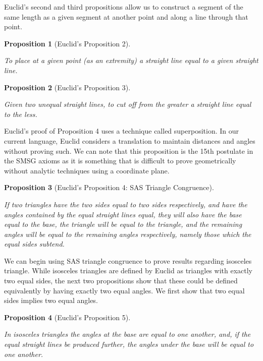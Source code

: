 \documentclass[
]{book}
\newtheorem{proposition}{Proposition}[chapter]
\theoremstyle{definition}
\theoremstyle{definition}
\theoremstyle{definition}
\theoremstyle{definition}
\theoremstyle{remark}
\begin{document}
Euclid's second and third propositions allow us to construct a segment of the same length as a given segment at another point and along a line through that point.

\begin{proposition}[Euclid's Proposition 2]
\protect\hypertarget{prp:prop2}{}\label{prp:prop2}

To place at a given point (as an extremity) a straight line equal to a given straight line.

\end{proposition}

\begin{proposition}[Euclid's Proposition 3]
\protect\hypertarget{prp:prop3}{}\label{prp:prop3}

Given two unequal straight lines, to cut off from the greater a straight line equal to the less.

\end{proposition}

Euclid's proof of Proposition 4 uses a technique called superposition. In our current language, Euclid considers a translation to maintain distances and angles without proving such. We can note that this proposition is the 15th postulate in the SMSG axioms as it is something that is difficult to prove geometrically without analytic techniques using a coordinate plane.

\begin{proposition}[Euclid's Proposition 4: SAS Triangle Congruence]
\protect\hypertarget{prp:prop4}{}\label{prp:prop4}

If two triangles have the two sides equal to two sides respectively, and have the angles contained by the equal straight lines equal, they will also have the base equal to the base, the triangle will be equal to the triangle, and the remaining angles will be equal to the remaining angles respectively, namely those which the equal sides subtend.

\end{proposition}

We can begin using SAS triangle congruence to prove results regarding isosceles triangle. While isosceles triangles are defined by Euclid as triangles with exactly two equal sides, the next two propositions show that these could be defined equivalently by having exactly two equal angles. We first show that two equal sides implies two equal angles.

\begin{proposition}[Euclid's Proposition 5]
\protect\hypertarget{prp:prop5}{}\label{prp:prop5}

In isosceles triangles the angles at the base are equal to one another, and, if the equal straight lines be produced further, the angles under the base will be equal to one another.

\end{proposition}
\end{document}
